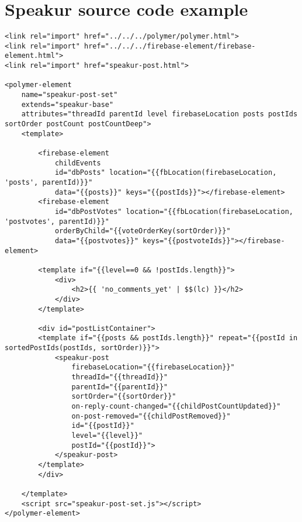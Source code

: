 \chapter{Speakur source code example}
%

\begin{changemargin}{-1cm}{-1.5cm}

\begin{lstlisting}[language=HTML5,caption=
{\tcode{speakur-post-set.html}},label=l:appendix1a,captionpos=top]
<link rel="import" href="../../../polymer/polymer.html">
<link rel="import" href="../../../firebase-element/firebase-element.html">
<link rel="import" href="speakur-post.html">

<polymer-element
    name="speakur-post-set"
    extends="speakur-base"
    attributes="threadId parentId level firebaseLocation posts postIds sortOrder postCount postCountDeep">
    <template>

        <firebase-element
            childEvents
            id="dbPosts" location="{{fbLocation(firebaseLocation, 'posts', parentId)}}"
            data="{{posts}}" keys="{{postIds}}"></firebase-element>
        <firebase-element
            id="dbPostVotes" location="{{fbLocation(firebaseLocation, 'postvotes', parentId)}}"
            orderByChild="{{voteOrderKey(sortOrder)}}"
            data="{{postvotes}}" keys="{{postvoteIds}}"></firebase-element>

        <template if="{{level==0 && !postIds.length}}">
            <div>
                <h2>{{ 'no_comments_yet' | $$(lc) }}</h2>
            </div>
        </template>

        <div id="postListContainer">
        <template if="{{posts && postIds.length}}" repeat="{{postId in sortedPostIds(postIds, sortOrder)}}">
            <speakur-post
                firebaseLocation="{{firebaseLocation}}"
                threadId="{{threadId}}"
                parentId="{{parentId}}"
                sortOrder="{{sortOrder}}"
                on-reply-count-changed="{{childPostCountUpdated}}"
                on-post-removed="{{childPostRemoved}}"
                id="{{postId}}"
                level="{{level}}"
                postId="{{postId}}">
            </speakur-post>
        </template>
        </div>

    </template>
    <script src="speakur-post-set.js"></script>
</polymer-element>
\end{lstlisting}


\end{changemargin}
